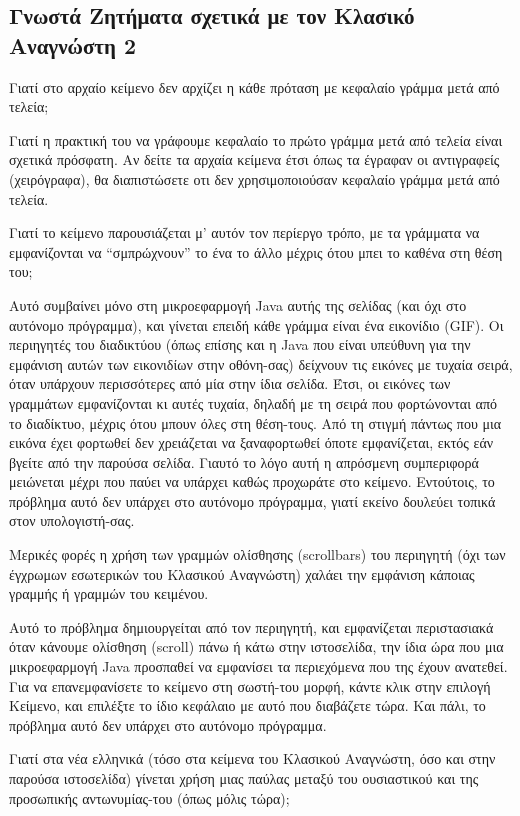 \documentclass[11pt]{article}
\begin{document}
\subsection{Γνωστά Ζητήματα σχετικά με τον Κλασικό Αναγνώστη 2}
Γιατί στο αρχαίο κείμενο δεν αρχίζει η κάθε πρόταση με κεφαλαίο γράμμα μετά από τελεία;

Γιατί η πρακτική του να γράφουμε κεφαλαίο το πρώτο γράμμα μετά από τελεία είναι σχετικά πρόσφατη. Αν δείτε τα αρχαία κείμενα έτσι όπως τα έγραφαν οι αντιγραφείς (χειρόγραφα), θα διαπιστώσετε οτι δεν χρησιμοποιούσαν κεφαλαίο γράμμα μετά από τελεία.

Γιατί το κείμενο παρουσιάζεται μ’ αυτόν τον περίεργο τρόπο, με τα γράμματα να εμφανίζονται να “σμπρώχνουν” το ένα το άλλο μέχρις ότου μπει το καθένα στη θέση του;

Αυτό συμβαίνει μόνο στη μικροεφαρμογή Java αυτής της σελίδας (και όχι στο αυτόνομο πρόγραμμα), και γίνεται επειδή κάθε γράμμα είναι ένα εικονίδιο (GIF). Οι περιηγητές του διαδικτύου (όπως επίσης και η Java που είναι υπεύθυνη για την εμφάνιση αυτών των εικονιδίων στην οθόνη-σας) δείχνουν τις εικόνες με τυχαία σειρά, όταν υπάρχουν περισσότερες από μία στην ίδια σελίδα. Έτσι, οι εικόνες των γραμμάτων εμφανίζονται κι αυτές τυχαία, δηλαδή με τη σειρά που φορτώνονται από το διαδίκτυο, μέχρις ότου μπουν όλες στη θέση-τους. Από τη στιγμή πάντως που μια εικόνα έχει φορτωθεί δεν χρειάζεται να ξαναφορτωθεί όποτε εμφανίζεται, εκτός εάν βγείτε από την παρούσα σελίδα. Γιαυτό το λόγο αυτή η απρόσμενη συμπεριφορά μειώνεται μέχρι που παύει να υπάρχει καθώς προχωράτε στο κείμενο. Εντούτοις, το πρόβλημα αυτό δεν υπάρχει στο αυτόνομο πρόγραμμα, γιατί εκείνο δουλεύει τοπικά στον υπολογιστή-σας.

Μερικές φορές η χρήση των γραμμών ολίσθησης (scrollbars) του περιηγητή (όχι των έγχρωμων εσωτερικών του Κλασικού Αναγνώστη) χαλάει την εμφάνιση κάποιας γραμμής ή γραμμών του κειμένου.

Αυτό το πρόβλημα δημιουργείται από τον περιηγητή, και εμφανίζεται περιστασιακά όταν κάνουμε ολίσθηση (scroll) πάνω ή κάτω στην ιστοσελίδα, την ίδια ώρα που μια μικροεφαρμογή Java προσπαθεί να εμφανίσει τα περιεχόμενα που της έχουν ανατεθεί. Για να επανεμφανίσετε το κείμενο στη σωστή-του μορφή, κάντε κλικ στην επιλογή Κείμενο, και επιλέξτε το ίδιο κεφάλαιο με αυτό που διαβάζετε τώρα. Και πάλι, το πρόβλημα αυτό δεν υπάρχει στο αυτόνομο πρόγραμμα.

Γιατί στα νέα ελληνικά (τόσο στα κείμενα του Κλασικού Αναγνώστη, όσο και στην παρούσα ιστοσελίδα) γίνεται χρήση μιας παύλας μεταξύ του ουσιαστικού και της προσωπικής αντωνυμίας-του (όπως μόλις τώρα);
\end{document}
